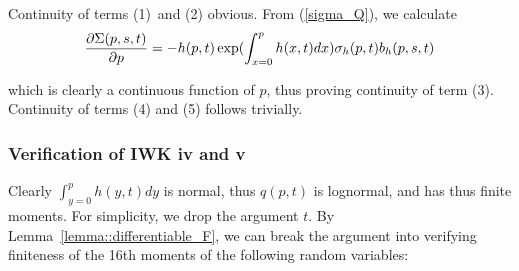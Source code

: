 \documentclass{article}
\begin{document}
Continuity of terms (1)\ and (2) obvious. From (\ref{sigma_Q}), we calculate
\begin{equation}
\frac{\partial \Sigma (p,s,t)}{\partial p}=-{h(p,t)}\exp ({%
\int_{x=0}^{p}h(x,t)dx)}\sigma _{h}(p,t)b_{h}(p,s,t)
\label{dsigmadp_thefirst}
\end{equation}

which is clearly a continuous function of $p$, thus proving continuity of
term (3). Continuity of terms (4) and (5) follows trivially.

\subsubsection{Verification of IWK iv and v}

Clearly ${\int_{y=0}^{p}h(y,t)dy}$ is normal, thus $q(p,t)$ is lognormal,
and has thus finite moments. For simplicity, we drop the argument $t$. By
Lemma~\ref{lemma::differentiable_F}, we can break the argument into
verifying finiteness of the 16th moments of the following random variables:
\end{document}
